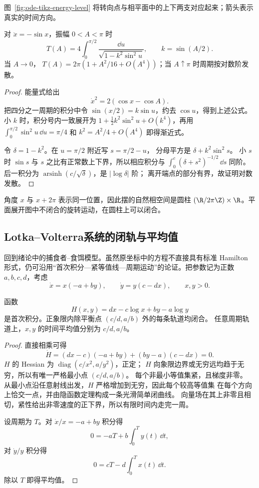 图~\ref{fig:ode-tikz-energy-level} 将转向点与相平面中的上下两支对应起来；箭头表示真实的时间方向。
\begin{center}
\begin{minipage}{0.96\linewidth}
\centering

\label{fig:ode-tikz-energy-level}
\end{minipage}
\end{center}

\begin{proposition}[数学摆的周期]
对 $\ddot x=-\sin x$，振幅 $0<A<\pi$ 时
\[
 T(A)=4\int_0^{\pi/2}
 \frac{\dd u}{\sqrt{1-k^2\sin^2u}},\qquad k=\sin(A/2).
\]
当 $A\to0$，
$T(A)=2\pi(1+A^2/16+O(A^4))$；当 $A\uparrow\pi$ 时周期按对数阶发散。
\end{proposition}
\begin{proof}
能量式给出 
\[
 \dot x^2=2(\cos x-\cos A).
\]
把四分之一周期的积分中令 $\sin(x/2)=k\sin u$，约去 $\cos u$，得到上述公式。
小 $k$ 时，积分号内一致展开为
$1+\frac12k^2\sin^2u+O(k^4)$，再用
$\displaystyle\int_0^{\pi/2}\sin^2u\,\dd u=\pi/4$ 和 $k^2=A^2/4+O(A^4)$ 即得渐近式。

令 $\delta=1-k^2$。在 $u=\pi/2$ 附近写 $s=\pi/2-u$，
分母平方是 $\delta+k^2\sin^2s$。
小 $s$ 时 $\sin s$ 与 $s$ 之比有正常数上下界，所以相应积分与
$\displaystyle\int_0^c(\delta+s^2)^{-1/2}\,\dd s$ 同阶。
后一积分为 $\operatorname{arsinh}(c/\sqrt\delta)$，是 $|\log\delta|$ 阶；
离开端点的部分有界，故证明对数发散。
\end{proof}
角度 $x$ 与 $x+2\pi$ 表示同一位置，因此摆的自然相空间是圆柱
$(\R/2\pi\Z)\times\R$。平面展开图中不闭合的旋转运动，在圆柱上可以闭合。


\subsection*{Lotka--Volterra系统的闭轨与平均值}
\label{sec:lv-energy}
回到绪论中的捕食者--食饵模型。虽然原坐标中的方程不直接具有标准 Hamilton 形式，仍可沿用“首次积分—紧等值线—周期运动”的论证。把参数记为正数 $a,b,c,d$，考虑
\[
 \dot x=x(-a+by),\qquad \dot y=y(c-dx),\qquad x,y>0.
\]
\begin{theorem}
函数
\[
 H(x,y)=dx-c\log x+by-a\log y
\]
是首次积分。正象限内除平衡点 $(c/d,a/b)$ 外的每条轨道均闭合。
任意周期轨道上，$x,y$ 的时间平均值分别为 $c/d,a/b$。
\end{theorem}
\begin{proof}
直接相乘可得
\[
 \dot H=(dx-c)(-a+by)+(by-a)(c-dx)=0.
\]
$H$ 的 Hessian 为 $\operatorname{diag}(c/x^2,a/y^2)$，正定；
$H$ 向象限边界或无穷远均趋于无穷，所以有唯一严格最小点 $(c/d,a/b)$。
每个非最小等值集紧，且梯度非零。
从最小点沿任意射线出发，$H$ 严格增加到无穷，因此每个较高等值集
在每个方向上恰交一点，并由隐函数定理构成一条光滑简单闭曲线。
向量场在其上非零且相切，紧性给出非零速度的正下界，所以有限时间内走完一周。

设周期为 $T$。对 $\dot x/x=-a+by$ 积分得
\[
 0=-aT+b\displaystyle\int_0^Ty(t)\,\dd t,
\]
对 $\dot y/y$ 积分得
\[
 0=cT-d\displaystyle\int_0^Tx(t)\,\dd t.
\]
除以 $T$ 即得平均值。
\end{proof}


